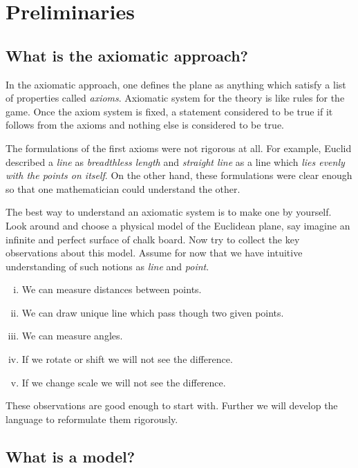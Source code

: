 \chapter{Preliminaries}\label{chap:metr}

\section*{What is the axiomatic approach?}

In the axiomatic approach,
one defines the plane as anything which satisfy 
a list of properties called {}\emph{axioms}.
Axiomatic system for the theory 
is like rules for the game.
Once the axiom system is fixed, a statement considered to be true if it follows from the axioms and nothing else is considered to be true.

The formulations of the first axioms were not rigorous at all.
For example, Euclid described a {}\emph{line} as {}\emph{breadthless length}
and {}\emph{straight line} as a line which {}\emph{lies evenly with the points on itself}.
On the other hand,
these formulations were clear enough so that one mathematician could understand the other.


The best way to understand an axiomatic system
is to make one by yourself.
Look around and choose a physical model 
of the Euclidean plane, 
say imagine an infinite and perfect surface of chalk board. 
Now try to collect the key observations
about this model.
Assume for now that we have intuitive understanding of such notions as {}\emph{line} and {}\emph{point}.
\begin{enumerate}[(i)]
 \item\label{preaxiomI} We can measure distances between points.
 \item\label{preaxiomII} We can draw unique line which pass though two given points.
 \item\label{preaxiomIII} We can measure angles.
 \item\label{preaxiomIV} If we rotate or shift we will not see the difference.
 \item\label{preaxiomV} If we change scale we will not see the difference.
\end{enumerate}
These observations are good enough to start with.
Further we will develop the language
to reformulate them rigorously.

\section*{What is a model?}

